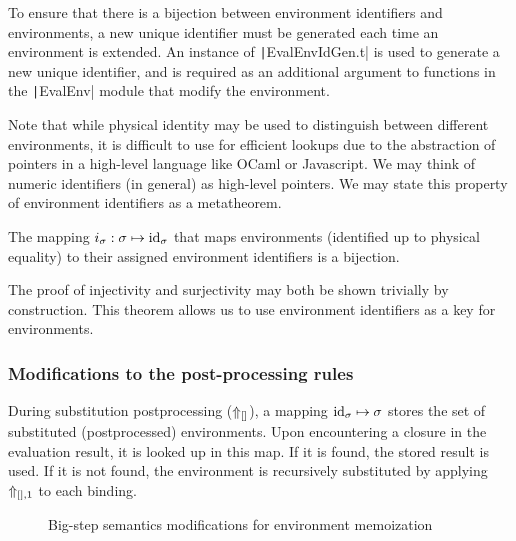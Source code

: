 To ensure that there is a bijection between environment identifiers and environments, a new unique identifier must be generated each time an environment is extended. An instance of \texttt|EvalEnvIdGen.t| is used to generate a new unique identifier, and is required as an additional argument to functions in the \texttt|EvalEnv| module that modify the environment.

Note that while physical identity may be used to distinguish between different environments, it is difficult to use for efficient lookups due to the abstraction of pointers in a high-level language like OCaml or Javascript. We may think of numeric identifiers (in general) as high-level pointers. We may state this property of environment identifiers as a metatheorem.

\begin{theorem}
  The mapping $i_\sigma:\sigma\mapsto\text{id}_\sigma$ that maps environments (identified up to physical equality) to their assigned environment identifiers is a bijection.
\end{theorem}

The proof of injectivity and surjectivity may both be shown trivially by construction. This theorem allows us to use environment identifiers as a key for environments.

\subsubsection{Modifications to the post-processing rules}
\label{sec:memoization-postprocessing}

During substitution postprocessing ($\Uparrow_{[]}$), a mapping $\text{id}_\sigma\mapsto\sigma$ stores the set of substituted (postprocessed) environments. Upon encountering a closure in the evaluation result, it is looked up in this map. If it is found, the stored result is used. If it is not found, the environment is recursively substituted by applying $\Uparrow_{[],1}$ to each binding.


\begin{figure}
  \centering
  \begin{mdframed}
    \begin{singlespace}
      
    \end{singlespace}
  \end{mdframed}
  \caption{Big-step semantics modifications for environment memoization}
  \label{fig:big-step-memoization-rules}
\end{figure}

